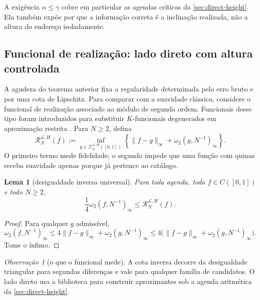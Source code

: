 \documentclass[11pt,a4paper]{article}
\newtheorem{lemma}[theorem]{Lema}
\theoremstyle{definition}
\theoremstyle{remark}
\newtheorem{remark}[theorem]{Observação}
\newcommand{\Library}{\mathcal{L}}
\begin{document}
A exigência $\alpha\le\gamma$ cobre em particular as agendas críticas da
\cref{sec:direct-height}. Ela também expõe por que a informação correta é a inclinação
realizada, não a altura do endereço isoladamente.

\subsection{Funcional de realização: lado direto com altura controlada}

A agudeza do teorema anterior fixa a regularidade determinada pelo erro bruto
e por uma cota de Lipschitz. Para comparar com a suavidade clássica, considere
o funcional de realização associado ao módulo de segunda ordem. Funcionais
desse tipo foram introduzidos para substituir $K$-funcionais degenerados em
aproximação restrita \citep{hristovivanov1990}. Para $N\ge2$, defina
\begin{equation}
 \mathcal R_N^{\Library,H}(f)
 :=\inf_{g\in\Sigma_N^{\Library,H}([0,1])}
 \left\{\|f-g\|_\infty+
 \omega_2(g,N^{-1})_\infty\right\}.
 \label{eq:self-roughness-certificate}
\end{equation}
O primeiro termo mede fidelidade; o segundo impede que uma função com quinas
receba suavidade apenas porque já pertence ao catálogo.

\begin{lemma}[desigualdade inversa universal]
\label{lem:universal-regularized-inverse}
Para toda agenda, toda $f\in C([0,1])$ e todo $N\ge2$,
\begin{equation}
 \frac14\omega_2(f,N^{-1})_\infty
 \le \mathcal R_N^{\Library,H}(f).
 \label{eq:universal-regularized-lower}
\end{equation}
\end{lemma}

\begin{proof}
Para qualquer $g$ admissível,
\[
 \omega_2(f,N^{-1})_\infty
 \le4\|f-g\|_\infty+\omega_2(g,N^{-1})_\infty
 \le4\bigl(\|f-g\|_\infty+\omega_2(g,N^{-1})_\infty\bigr).
\]
Tome o ínfimo.
\end{proof}

\begin{remark}[o que o funcional mede]
\label{rem:realization-functional-scope}
A cota inversa decorre da desigualdade triangular para segundas diferenças e vale para qualquer família de candidatos. O lado direto usa a biblioteca para construir aproximantes sob a agenda aritmética da \cref{sec:direct-height}.
\end{remark}
\end{document}
